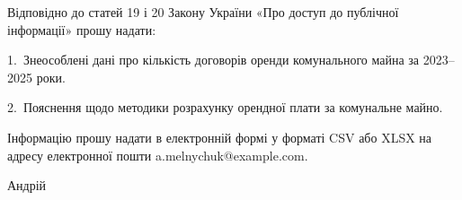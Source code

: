 \documentclass[14pt]{dstu4163}
\begin{document}
\makeletterhead

Відповідно до статей 19 і 20 Закону України «Про доступ до публічної
інформації» прошу надати:

1.~Знеособлені дані про кількість договорів оренди комунального
майна за 2023–2025 роки.

2.~Пояснення щодо методики розрахунку орендної плати
за комунальне майно.

Інформацію прошу надати в електронній формі у форматі CSV або XLSX
на адресу електронної пошти a.melnychuk@example.com.

\signature[date = 18.11.2026]{}{Андрій }
\end{document}
